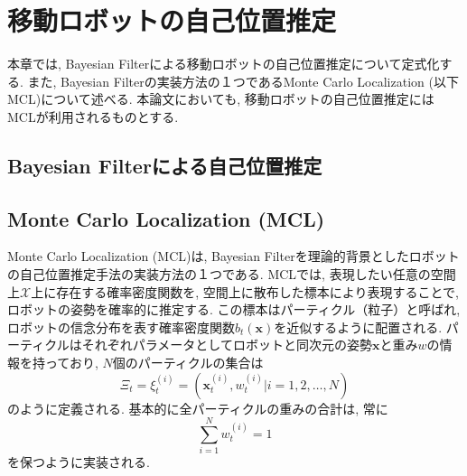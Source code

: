 \chapter{移動ロボットの自己位置推定} \label{chapter:localization}

本章では, Bayesian Filterによる移動ロボットの自己位置推定について定式化する. 
また, Bayesian Filterの実装方法の１つであるMonte Carlo Localization (以下MCL)について述べる. 
本論文においても, 移動ロボットの自己位置推定にはMCLが利用されるものとする. 



\section{Bayesian Filterによる自己位置推定}




\section{Monte Carlo Localization (MCL)}

Monte Carlo Localization (MCL)は, Bayesian Filterを理論的背景としたロボットの自己位置推定手法の実装方法の１つである. 
MCLでは, 表現したい任意の空間上$\mathcal{X}$上に存在する確率密度関数を, 空間上に散布した標本により表現することで, ロボットの姿勢を確率的に推定する. 
この標本はパーティクル（粒子）と呼ばれ, ロボットの信念分布を表す確率密度関数$b_t(\bm{x})$を近似するように配置される. 
パーティクルはそれぞれパラメータとしてロボットと同次元の姿勢$\bm{x}$と重み$w$の情報を持っており, $N$個のパーティクルの集合は
\begin{equation}
\label{particles}
  \Xi_{t} = {\xi^{(i)}_{t} = (\bm{x}^{(i)}_{t}, w^{(i)}_{t} |i = 1,2,\dots,N) }
\end{equation}
のように定義される. 
基本的に全パーティクルの重みの合計は, 常に
\begin{equation}
\label{weight_sum}
  \sum_{i=1}^{N}w^{(i)}_{t}=1
\end{equation}
を保つように実装される. 

